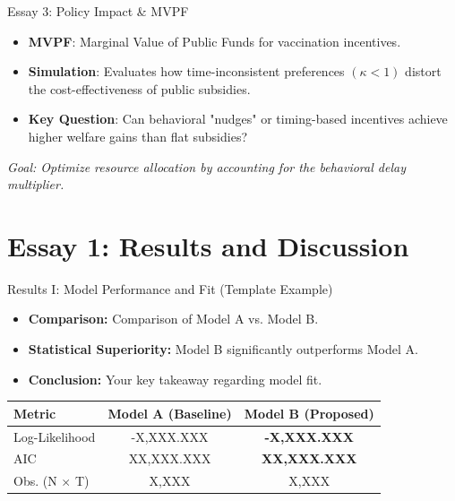 \documentclass[10pt, aspectratio=169, xcolor={svgnames}]{beamer}
\begin{document}
\begin{frame}{Essay 3: Policy Impact \& MVPF}
    \begin{itemize}
        \item \textbf{MVPF}: Marginal Value of Public Funds for vaccination incentives.
        \item \textbf{Simulation}: Evaluates how time-inconsistent preferences $(\kappa < 1)$ distort the cost-effectiveness of public subsidies.
        \item \textbf{Key Question}: Can behavioral "nudges" or timing-based incentives achieve higher welfare gains than flat subsidies?
    \end{itemize}
    \begin{center}
        \textit{Goal: Optimize resource allocation by accounting for the behavioral delay multiplier.}
    \end{center}
\end{frame}

\section{Essay 1: Results and Discussion}

\begin{frame}{Results I: Model Performance and Fit (Template Example)}
    \begin{itemize}
        \item \textbf{Comparison:} Comparison of Model A vs. Model B.
        \item \textbf{Statistical Superiority:} Model B significantly outperforms Model A.
        \item \textbf{Conclusion:} Your key takeaway regarding model fit.
    \end{itemize}
    \begin{table}
        \centering
        \small
        \begin{tabular}{lcc}
            \toprule
            Metric & Model A (Baseline) & Model B (Proposed) \\
            \midrule
            Log-Likelihood & -X,XXX.XXX & \textbf{-X,XXX.XXX} \\
            AIC & XX,XXX.XXX & \textbf{XX,XXX.XXX} \\
            Obs. (N $\times$ T) & X,XXX & X,XXX \\
            \bottomrule
        \end{tabular}
    \end{table}
\end{frame}
\end{document}
